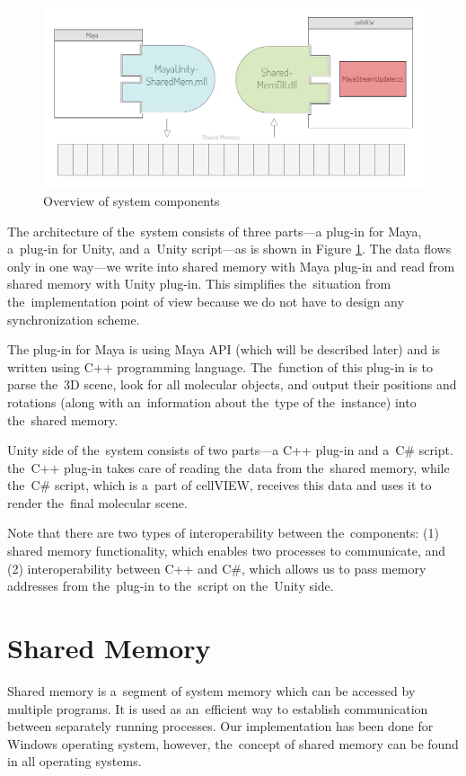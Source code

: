 \documentclass[
  digital, %
  table,   %
  nolof,     %
  nolot,     %
  oneside,
]{fithesis3}
\begin{document}
\begin{figure}
  \begin{center}
    \includegraphics[scale=0.8]{images/system-overview.pdf}
  \end{center}
  \caption{Overview of system components}
  \label{fig:system-overview}
\end{figure}

The architecture of the system consists of three parts—a plug-in for Maya, a plug-in for Unity, and a Unity script—as is shown in Figure \ref{fig:system-overview}.
The data flows only in one way—we write into shared memory with Maya plug-in and read from shared memory with Unity plug-in. This simplifies the situation from the implementation point of view because we do not have to design any synchronization scheme.

The plug-in for Maya is using Maya API (which will be described later) and is written using C++ programming language. The function of this plug-in is to parse the 3D scene, look for all molecular objects, and output their positions and rotations (along with an information about the type of the instance) into the shared memory.

Unity side of the system consists of two parts—a C++ plug-in and a C\# script. the C++ plug-in takes care of reading the data from the shared memory, while the C\# script, which is a part of cellVIEW, receives this data and uses it to render the final molecular scene.

Note that there are two types of interoperability between the components: (1) shared memory functionality, which enables two processes to communicate, and (2) interoperability between C++ and C\#, which allows us to pass memory addresses from the plug-in to the script on the Unity side.

\section{Shared Memory}
Shared memory is a segment of system memory which can be accessed by multiple programs. It is used as an efficient way to establish communication between separately running processes. Our implementation has been done for Windows operating system, however, the concept of shared memory can be found in all operating systems.
\end{document}
